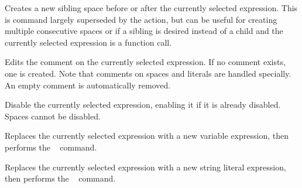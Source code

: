 
Creates a new sibling space before or after the currently selected
expression. This is command largely superseded by the
\hyperref[cmd:smart_space]{} \keys{\SPACE} action, but can be
useful for creating multiple consecutive spaces or if a sibling is desired
instead of a child and the currently selected expression is a function call.

Edits the comment on the currently selected expression. If no comment exists,
one is created. Note that comments on spaces and literals are handled
specially. An empty comment is automatically removed.

Disable the currently selected expression, enabling it if it is already
disabled. Spaces cannot be disabled.

Replaces the currently selected expression with a new variable expression, then
performs the \hyperref[cmd:edit]{}~\keys{\return} command.

Replaces the currently selected expression with a new string literal
expression, then
performs the \hyperref[cmd:edit]{}~\keys{\return} command.



